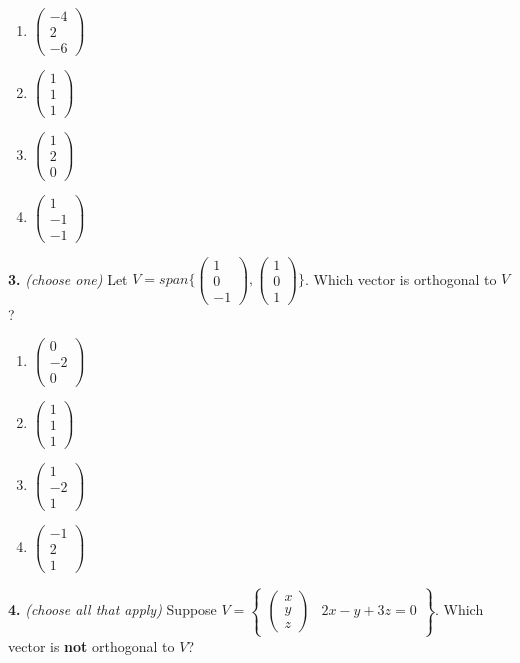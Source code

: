 \documentclass[10pt,a4paper]{article}
\begin{document}
\begin{enumerate}[label=(\Alph*)]
\item \(\begin{pmatrix}-4\\2\\-6\end{pmatrix}\)
\item \(\begin{pmatrix}1\\1\\1\end{pmatrix}\)
\item \(\begin{pmatrix}1\\2\\0\end{pmatrix}\)
\item \(\begin{pmatrix}1\\-1\\-1\end{pmatrix}\)
\end{enumerate}
\smallskip
\textbf{3.} \textit{(choose one)} Let \(V=span\{\begin{pmatrix}1\\0\\-1\end{pmatrix},\begin{pmatrix}1\\0\\1\end{pmatrix}\}\). Which vector is orthogonal to \(V\)?

\begin{enumerate}[label=(\Alph*)]
\item \(\begin{pmatrix}0\\-2\\0\end{pmatrix}\)
\item \(\begin{pmatrix}1\\1\\1\end{pmatrix}\)
\item \(\begin{pmatrix}1\\-2\\1\end{pmatrix}\)
\item \(\begin{pmatrix}-1\\2\\1\end{pmatrix}\)
\end{enumerate}
\smallskip
\textbf{4.} \textit{(choose all that apply)} Suppose \(V=\left\{\begin{array}{c|c}\begin{pmatrix}x\\y\\z\end{pmatrix}&2x-y+3z=0\end{array}\right\}\). Which vector is \textbf{not }orthogonal to \(V\)?
\end{document}
